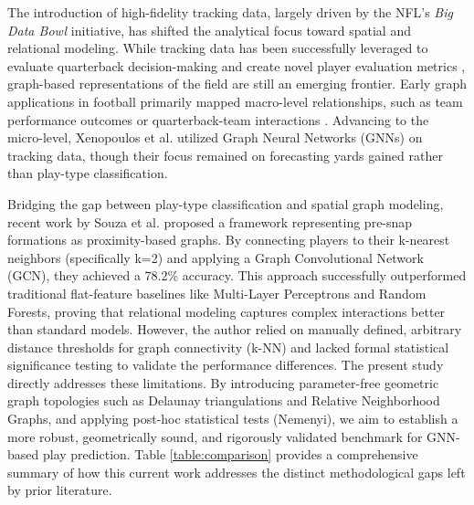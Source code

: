 \documentclass[runningheads]{llncs}
\begin{document}
The introduction of high-fidelity tracking data, largely driven by the NFL's \textit{Big Data Bowl} initiative, has shifted the analytical focus toward spatial and relational modeling. While tracking data has been successfully leveraged to evaluate quarterback decision-making \cite{Reyers2023} and create novel player evaluation metrics \cite{Eager2022}, graph-based representations of the field are still an emerging frontier. Early graph applications in football primarily mapped macro-level relationships, such as team performance outcomes \cite{Xia2018} or quarterback-team interactions \cite{Salim2018}. Advancing to the micro-level, Xenopoulos et al. \cite{Xenopoulos2021} utilized Graph Neural Networks (GNNs) on tracking data, though their focus remained on forecasting yards gained rather than play-type classification.

Bridging the gap between play-type classification and spatial graph modeling, recent work by Souza et al. \cite{souza2025nfl} proposed a framework representing pre-snap formations as proximity-based graphs. By connecting players to their k-nearest neighbors (specifically k=2) and applying a Graph Convolutional Network (GCN), they achieved a 78.2\% accuracy. This approach successfully outperformed traditional flat-feature baselines like Multi-Layer Perceptrons and Random Forests, proving that relational modeling captures complex interactions better than standard models. However, the author relied on manually defined, arbitrary distance thresholds for graph connectivity (k-NN) and lacked formal statistical significance testing to validate the performance differences. The present study directly addresses these limitations. By introducing parameter-free geometric graph topologies such as Delaunay triangulations and Relative Neighborhood Graphs, and applying post-hoc statistical tests (Nemenyi), we aim to establish a more robust, geometrically sound, and rigorously validated benchmark for GNN-based play prediction. Table \ref{table:comparison} provides a comprehensive summary of how this current work addresses the distinct methodological gaps left by prior literature.
\end{document}

